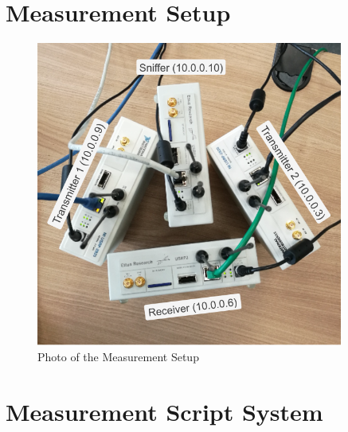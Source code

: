 \section{Measurement Setup}

\begin{figure}[ht]
	\label{fig:measurement-setup}
	\begin{center}
		\includegraphics[width=0.9\textwidth]{pictures/measurement_setup}
	\end{center}
	\caption{Photo of the Measurement Setup}
\end{figure}

\section{Measurement Script System}
\label{sec:script-system}

